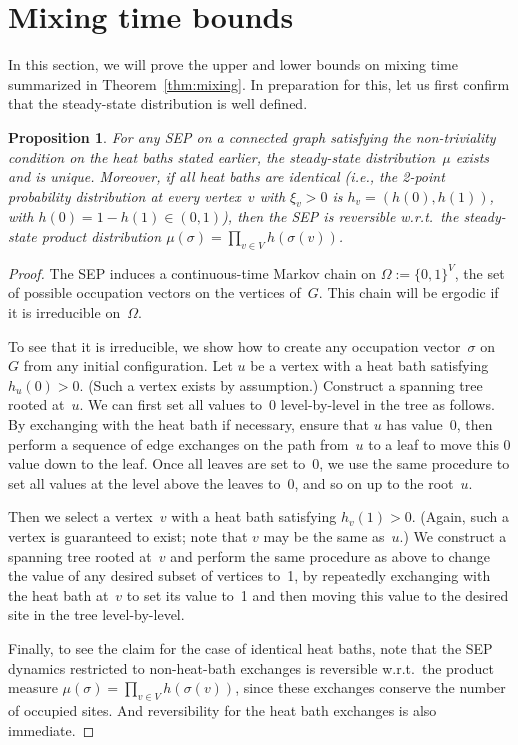 \documentclass[11pt]{article}
\theoremstyle{plain}
\newtheorem{proposition}[theorem]{Proposition}
\theoremstyle{definition}
\theoremstyle{remark}
\numberwithin{equation}{section}
\begin{document}
\section{Mixing time bounds}\label{sec:mixing}
In this section, we will prove the upper and lower bounds on mixing time summarized in Theorem~\ref{thm:mixing}.
In preparation for this, let us first confirm that the steady-state distribution is well defined.
\begin{proposition}\label{prop:basic}
For any SEP on a connected graph satisfying the non-triviality condition on the heat baths stated earlier,
the steady-state distribution~$\mu$ exists and is unique.  Moreover, if all heat baths are identical
(i.e., the 2-point probability distribution at every vertex~$v$ with $\xi_v>0$ is $h_v=(h(0),h(1))$, 
with $h(0)=1-h(1)\in (0,1)$), then the SEP is reversible w.r.t.\ the steady-state product distribution 
$\mu(\sigma)=\prod_{v\in V} h(\sigma(v))$.
\end{proposition}

\begin{proof}
The SEP induces a continuous-time Markov chain on $\Omega:=\{0,1\}^V$, the set of possible
occupation vectors on the vertices of~$G$.  This chain will be ergodic if it is irreducible on~$\Omega$.

To see that it is irreducible, we show how to create any occupation vector~$\sigma$ on~$G$ from
any initial configuration. Let $u$ be a vertex with a heat bath satisfying $h_u(0) > 0$.  (Such a 
vertex exists by assumption.)   Construct a spanning tree rooted at~$u$.  We can first
set all values to~0 level-by-level in the tree as follows.  By exchanging with
the heat bath if necessary, ensure that $u$ has value~0, then perform a sequence of edge
exchanges on the path from~$u$ to a leaf to move this 0 value down to the leaf.  
Once all leaves are set to~0, we use the same procedure to set all values at the level
above the leaves to~0, and so on up to the root~$u$.

Then we select a vertex~$v$ with a heat bath satisfying $h_v(1) > 0$.  (Again, such a vertex
is guaranteed to exist; note that $v$ may be the same as~$u$.)  We construct a spanning tree
rooted at~$v$ and perform the same procedure as above to change the value of any desired
subset of vertices to~1, by repeatedly exchanging with the heat bath at~$v$ to set its value to~1
and then moving this value to the desired site in the tree level-by-level.

Finally, to see the claim for the case of identical heat baths, note that the SEP dynamics
restricted to non-heat-bath exchanges is reversible w.r.t.\ the product measure 
$\mu(\sigma)=\prod_{v\in V} h(\sigma(v))$, since these exchanges conserve the number
of occupied sites.  And reversibility for the heat bath exchanges is also immediate.
\end{proof}
\end{document}
